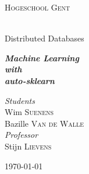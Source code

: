\documentclass[12pt]{DistributedDatabases}[2021/12/09]
\begin{document}
\frontmatter %

\begin{titlepage}
\begin{center}

\vspace*{.06\textheight}
{\scshape\LARGE{Hogeschool Gent}}
\vspace{1.5cm}

\HRule \\[0.8cm] %
{\huge{Distributed Databases}}\vspace{0.4cm}
\HRule \\[1.5cm] %

\vfill

\large \textit{\textbf{Machine Learning}}\\[0.4cm]
\textit{\textbf{with}}\\[0.4cm]
\textit{\textbf{auto-sklearn}}\\[0.4cm]

\vfill

\begin{flushright} \large
  \emph{Students}\\
  Wim \textsc{Suenens} \\
  Bazille \textsc{Van de Walle} \\
  \vspace{1.0cm}
  \emph{Professor}\\
  Stijn \textsc{Lievens}
\end{flushright}

\vfill

{\large \today}\\[2cm]

\vfill
\end{center}
\end{titlepage}

\tableofcontents

\mainmatter %
\setcounter{page}{1}




\end{document}
